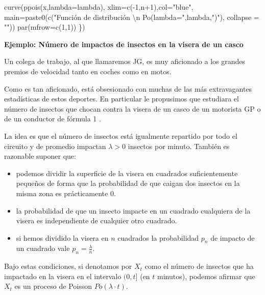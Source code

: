 \documentclass[
  letterpaper,
  DIV=11,
  numbers=noendperiod]{scrreprt}
\newenvironment{Shaded}{\begin{snugshade}}{\end{snugshade}}
\newcommand{\AttributeTok}[1]{\textcolor[rgb]{0.40,0.45,0.13}{#1}}
\newcommand{\DecValTok}[1]{\textcolor[rgb]{0.68,0.00,0.00}{#1}}
\newcommand{\FunctionTok}[1]{\textcolor[rgb]{0.28,0.35,0.67}{#1}}
\newcommand{\NormalTok}[1]{\textcolor[rgb]{0.00,0.23,0.31}{#1}}
\newcommand{\SpecialCharTok}[1]{\textcolor[rgb]{0.37,0.37,0.37}{#1}}
\newcommand{\StringTok}[1]{\textcolor[rgb]{0.13,0.47,0.30}{#1}}
\providecommand{\tightlist}{%
  \setlength{\itemsep}{0pt}\setlength{\parskip}{0pt}}\usepackage{longtable,booktabs,array}
\begin{document}
\begin{Shaded}
\begin{Highlighting}[]
  \FunctionTok{curve}\NormalTok{(}\FunctionTok{ppois}\NormalTok{(x,}\AttributeTok{lambda=}\NormalTok{lambda),}
        \AttributeTok{xlim=}\FunctionTok{c}\NormalTok{(}\SpecialCharTok{{-}}\DecValTok{1}\NormalTok{,n}\SpecialCharTok{+}\DecValTok{1}\NormalTok{),}\AttributeTok{col=}\StringTok{"blue"}\NormalTok{,}
        \AttributeTok{main=}\FunctionTok{paste0}\NormalTok{(}\FunctionTok{c}\NormalTok{(}\StringTok{"Función de distribución }\SpecialCharTok{\textbackslash{}n}\StringTok{ Po(lambda="}\NormalTok{,lambda,}\StringTok{")"}\NormalTok{),}
                    \AttributeTok{collapse =} \StringTok{""}\NormalTok{))}
  \FunctionTok{par}\NormalTok{(}\AttributeTok{mfrow=}\FunctionTok{c}\NormalTok{(}\DecValTok{1}\NormalTok{,}\DecValTok{1}\NormalTok{))}
\NormalTok{  \})}
\end{Highlighting}
\end{Shaded}

\textbf{Ejemplo: Número de impactos de insectos en la visera de un
casco}

Un colega de trabajo, al que llamaremos JG, es muy aficionado a los
grandes premios de velocidad tanto en coches como en motos.

Como es tan aficionado, está obsesionado con muchas de las más
extravagantes estadísticas de estos deportes. En particular le
propusimos que estudiara el número de insectos que chocan contra la
visera de un casco de un motorista GP o de un conductor de fórmula 1 .

La idea es que el número de insectos está igualmente repartido por todo
el circuito y de promedio impactan \(\lambda>0\) insectos por minuto.
También es razonable suponer que:

\begin{itemize}
\tightlist
\item
  podemos dividir la superficie de la visera en cuadrados
  suficientemente pequeños de forma que la probabilidad de que caigan
  dos insectos en la misma zona es prácticamente 0.
\item
  la probabilidad de que un insecto impacte en un cuadrado cualquiera de
  la visera es independiente de cualquier otro cuadrado.
\item
  si hemos dividido la visera en \(n\) cuadrados la probabilidad \(p_n\)
  de impacto de un cuadrado vale \(p_n=\frac{\lambda}{n}\).
\end{itemize}

Bajo estas condiciones, si denotamos por \(X_t\) como el número de
insectos que ha impactado en la visera en el intervalo \((0,t]\) (en
\(t\) minutos), podemos afirmar que \(X_t\) es un proceso de Poisson
\(Po(\lambda\cdot t)\).
\end{document}
